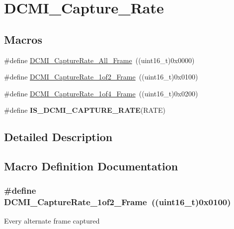 \hypertarget{group___d_c_m_i___capture___rate}{}\section{D\+C\+M\+I\+\_\+\+Capture\+\_\+\+Rate}
\label{group___d_c_m_i___capture___rate}
\subsection*{Macros}
\begin{DoxyCompactItemize}
\item 
\#define \hyperlink{group___d_c_m_i___capture___rate_gac6fe1a56c081942ad0398e727280f4b5}{D\+C\+M\+I\+\_\+\+Capture\+Rate\+\_\+\+All\+\_\+\+Frame}~((uint16\+\_\+t)0x0000)
\item 
\#define \hyperlink{group___d_c_m_i___capture___rate_ga9f89cbc2c2af326e029327603b2b5e78}{D\+C\+M\+I\+\_\+\+Capture\+Rate\+\_\+1of2\+\_\+\+Frame}~((uint16\+\_\+t)0x0100)
\item 
\#define \hyperlink{group___d_c_m_i___capture___rate_gab1cffa0fc41d2dabe1320370060434f2}{D\+C\+M\+I\+\_\+\+Capture\+Rate\+\_\+1of4\+\_\+\+Frame}~((uint16\+\_\+t)0x0200)
\item 
\#define {\bfseries I\+S\+\_\+\+D\+C\+M\+I\+\_\+\+C\+A\+P\+T\+U\+R\+E\+\_\+\+R\+A\+T\+E}(R\+A\+T\+E)
\end{DoxyCompactItemize}


\subsection{Detailed Description}


\subsection{Macro Definition Documentation}
\hypertarget{group___d_c_m_i___capture___rate_ga9f89cbc2c2af326e029327603b2b5e78}{}
\subsubsection[{D\+C\+M\+I\+\_\+\+Capture\+Rate\+\_\+1of2\+\_\+\+Frame}]{\setlength{\rightskip}{0pt plus 5cm}\#define D\+C\+M\+I\+\_\+\+Capture\+Rate\+\_\+1of2\+\_\+\+Frame~((uint16\+\_\+t)0x0100)}\label{group___d_c_m_i___capture___rate_ga9f89cbc2c2af326e029327603b2b5e78}
Every alternate frame captured \hypertarget{group___d_c_m_i___capture___rate_gab1cffa0fc41d2dabe1320370060434f2}{}
